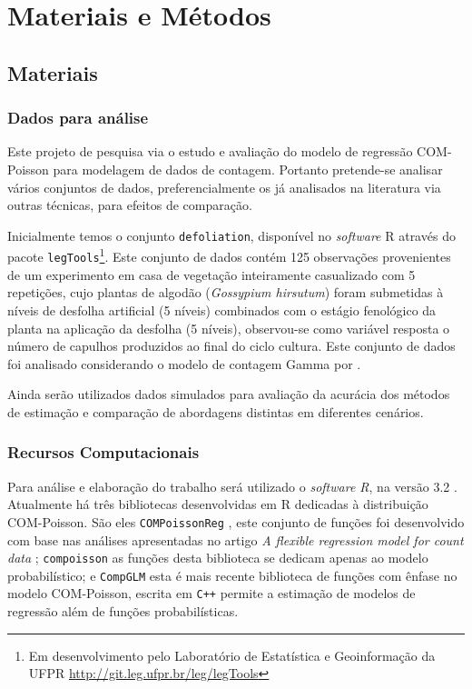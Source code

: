 \documentclass[
12pt,				%
openright,			%
oneside,			%
a4paper,			%
english,			%
brazil,				%
]{abntex2}
\begin{document}
\chapter{Materiais e Métodos}
\label{cha:materiaisemetodos}

\section{Materiais}
\label{sec:materiais}

\subsection{Dados para análise}
\label{sec:dados}

Este projeto de pesquisa via o estudo e avaliação do modelo de regressão
COM-Poisson para modelagem de dados de contagem. Portanto pretende-se
analisar vários conjuntos de dados, preferencialmente os já analisados
na literatura via outras técnicas, para efeitos de comparação.

Inicialmente temos o conjunto \texttt{defoliation}, disponível no
\textit{software} R através do pacote \texttt{legTools}\footnote{Em
  desenvolvimento pelo Laboratório de Estatística e Geoinformação da
  UFPR \url{http://git.leg.ufpr.br/leg/legTools}}. Este conjunto de
dados contém 125 observações provenientes de um experimento em casa de
vegetação inteiramente casualizado com 5 repetições, cujo plantas de
algodão (\textit{Gossypium hirsutum}) foram submetidas à níveis de
desfolha artificial (5 níveis) combinados com o estágio fenológico da
planta na aplicação da desfolha (5 níveis), observou-se como variável
resposta o número de capulhos produzidos ao final do ciclo cultura. Este
conjunto de dados foi analisado considerando o modelo de contagem Gamma
por .

Ainda serão utilizados dados simulados para avaliação da acurácia dos
métodos de estimação e comparação de abordagens distintas em diferentes
cenários.

\subsection{Recursos Computacionais}
\label{sec:recursos}

Para análise e elaboração do trabalho será utilizado o
\textit{software R}, na versão 3.2 \cite{Rcore2015}. 
Atualmente há três bibliotecas desenvolvidas em R dedicadas
à distribuição COM-Poisson. São eles \texttt{COMPoissonReg}
\cite{COMPoissonReg}, este conjunto de funções foi 
desenvolvido com base nas análises apresentadas no artigo
\textit{A flexible regression model for count data} 
\cite{Sellers2010}; \texttt{compoisson} as funções desta 
biblioteca se dedicam apenas ao modelo probabilístico; e
\texttt{CompGLM} esta é mais recente biblioteca de funções 
com ênfase no modelo COM-Poisson, escrita em \texttt{C++}
permite a estimação de modelos de regressão além de funções 
probabilísticas.
\end{document}
